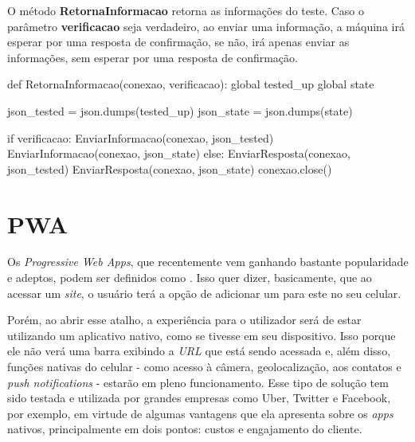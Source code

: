 O método \textbf{RetornaInformacao} retorna as informações do teste. Caso o parâmetro \textbf{verificacao} seja verdadeiro, ao enviar uma informação, a máquina irá esperar por uma resposta 
de confirmação, se não, irá apenas enviar as informações, sem esperar por uma resposta de confirmação.

\vspace*{1cm}
\begin{python}
def RetornaInformacao(conexao, verificacao):
    global tested_up
    global state

    json_tested = json.dumps(tested_up)
    json_state = json.dumps(state)

    if verificacao:
        EnviarInformacao(conexao, json_tested)
        EnviarInformacao(conexao, json_state)
    else:
        EnviarResposta(conexao, json_tested)
        EnviarResposta(conexao, json_state)
    conexao.close()
\end{python}




















\section{PWA}
\label{sec:pwa}

Os \textit{Progressive Web Apps}, que recentemente vem ganhando bastante popularidade e adeptos, podem ser definidos como \cite{Souza19} . Isso quer dizer, basicamente, que ao acessar um \textit{site}, o usuário terá a opção de adicionar um  para este no seu celular.

Porém, ao abrir esse atalho, a experiência para o utilizador será de estar utilizando um aplicativo nativo, como se tivesse  em seu dispositivo. Isso porque ele não verá uma barra exibindo a \textit{URL} que está sendo acessada e, além disso, funções nativas do celular - como acesso à câmera, geolocalização, aos contatos e \textit{push notifications} - estarão em pleno funcionamento. Esse tipo de solução tem sido testada e utilizada por grandes empresas como Uber, Twitter e Facebook, por exemplo, em virtude de algumas vantagens que ela apresenta sobre os \textit{apps} nativos, principalmente em dois pontos: custos e engajamento do cliente.


